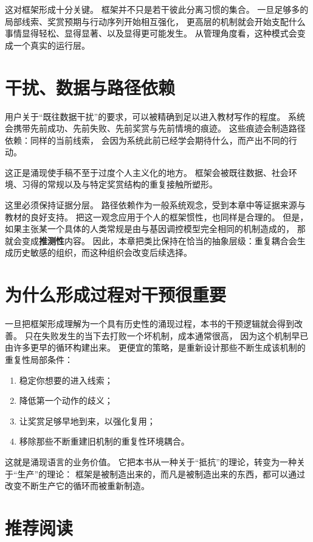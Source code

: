这对框架形成十分关键。
框架并不只是若干彼此分离习惯的集合。
一旦足够多的局部线索、奖赏预期与行动序列开始相互强化，
更高层的机制就会开始支配什么事情显得轻松、显得显著、以及显得更可能发生。
从管理角度看，这种模式会变成一个真实的运行层。

\section{干扰、数据与路径依赖}

用户关于“既往数据干扰”的要求，可以被精确到足以进入教材写作的程度。
系统会携带先前成功、先前失败、先前奖赏与先前情境的痕迹。
这些痕迹会制造路径依赖：同样的当前线索，
会因为系统此前已经学会期待什么，而产出不同的行动。

\begin{remark}
这正是涌现使手稿不至于过度个人主义化的地方。
框架会被既往数据、社会环境、习得的常规以及与特定奖赏结构的重复接触所塑形。
\end{remark}

这里必须保持证据分层。
路径依赖作为一般系统观念，受到本章中等证据来源与教材的良好支持。
把这一观念应用于个人的框架惯性，也同样是合理的。
但是，如果主张某一个具体的人类常规是由与基因调控模型完全相同的机制造成的，
那就会变成\textbf{推测性}内容。
因此，本章把类比保持在恰当的抽象层级：重复耦合会生成历史敏感的组织，而这种组织会改变后续选择。

\section{为什么形成过程对干预很重要}

一旦把框架形成理解为一个具有历史性的涌现过程，本书的干预逻辑就会得到改善。
只在失败发生的当下去打败一个坏机制，成本通常很高，
因为这个机制早已由许多更早的循环构建出来。
更便宜的策略，是重新设计那些不断生成该机制的重复性局部条件：
\begin{enumerate}[nosep]
  \item 稳定你想要的进入线索；
  \item 降低第一个动作的歧义；
  \item 让奖赏足够早地到来，以强化复用；
  \item 移除那些不断重建旧机制的重复性环境耦合。
\end{enumerate}

这就是涌现语言的业务价值。
它把本书从一种关于“抵抗”的理论，转变为一种关于“生产”的理论：
框架是被制造出来的，而凡是被制造出来的东西，都可以通过改变不断生产它的循环而被重新制造。

\section{推荐阅读}


